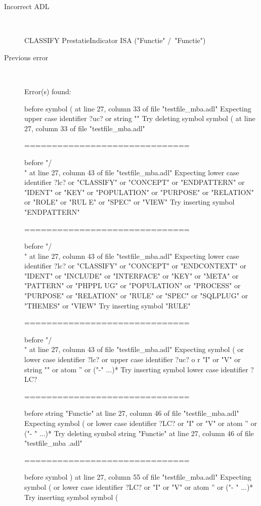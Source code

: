 \begin{description}
  \item[Incorrect ADL]~\\
\begin{adl}
CLASSIFY PrestatieIndicator ISA ("Functie" /\ "Functie")\end{adl}
  \item[Previous error]~\\
\begin{haskell}
Error(s) found:

before symbol ( at line 27, column 33 of file "testfile_mba.adl"
Expecting upper case identifier ?uc? or string ""
Try deleting symbol symbol ( at line 27, column 33 of file "testfile_mba.adl"

==============================

before "/\\" at line 27, column 43 of file "testfile_mba.adl"
Expecting lower case identifier ?lc? or "CLASSIFY" or "CONCEPT" or "ENDPATTERN"
or "IDENT" or "KEY" or "POPULATION" or "PURPOSE" or "RELATION" or "ROLE" or "RUL
E" or "SPEC" or "VIEW"
Try inserting symbol "ENDPATTERN"

==============================

before "/\\" at line 27, column 43 of file "testfile_mba.adl"
Expecting lower case identifier ?lc? or "CLASSIFY" or "CONCEPT" or "ENDCONTEXT"
or "IDENT" or "INCLUDE" or "INTERFACE" or "KEY" or "META" or "PATTERN" or "PHPPL
UG" or "POPULATION" or "PROCESS" or "PURPOSE" or "RELATION" or "RULE" or "SPEC"
or "SQLPLUG" or "THEMES" or "VIEW"
Try inserting symbol "RULE"

==============================

before "/\\" at line 27, column 43 of file "testfile_mba.adl"
Expecting symbol ( or lower case identifier ?lc? or upper case identifier ?uc? o
r "I" or "V" or string "" or atom '' or ("-" ...)*
Try inserting symbol lower case identifier ?LC?

==============================

before string "Functie" at line 27, column 46 of file "testfile_mba.adl"
Expecting symbol ( or lower case identifier ?LC? or "I" or "V" or atom '' or ("-
" ...)*
Try deleting symbol string "Functie" at line 27, column 46 of file "testfile_mba
.adl"

==============================

before symbol ) at line 27, column 55 of file "testfile_mba.adl"
Expecting symbol ( or lower case identifier ?LC? or "I" or "V" or atom '' or ("-
" ...)*
Try inserting symbol symbol (


\end{haskell}
\end{description}

